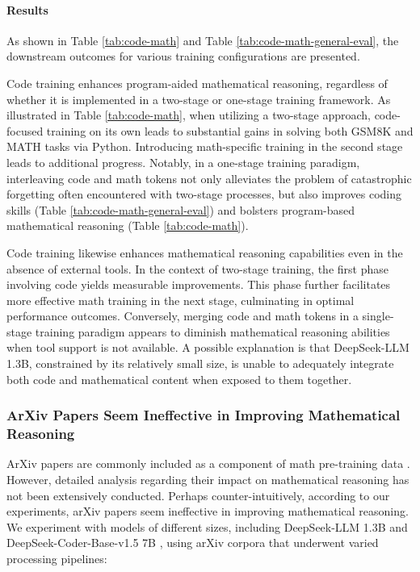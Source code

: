 \begin{itemize}[topsep=0pt]
\begin{itemize}[topsep=0pt]
\paragraph{Results}
As shown in Table \ref{tab:code-math} and Table \ref{tab:code-math-general-eval}, the downstream outcomes for various training configurations are presented.

Code training enhances program-aided mathematical reasoning, regardless of whether it is implemented in a two-stage or one-stage training framework. As illustrated in Table \ref{tab:code-math}, when utilizing a two-stage approach, code-focused training on its own leads to substantial gains in solving both GSM8K and MATH tasks via Python. Introducing math-specific training in the second stage leads to additional progress. Notably, in a one-stage training paradigm, interleaving code and math tokens not only alleviates the problem of catastrophic forgetting often encountered with two-stage processes, but also improves coding skills (Table \ref{tab:code-math-general-eval}) and bolsters program-based mathematical reasoning (Table \ref{tab:code-math}).

Code training likewise enhances mathematical reasoning capabilities even in the absence of external tools. In the context of two-stage training, the first phase involving code yields measurable improvements. This phase further facilitates more effective math training in the next stage, culminating in optimal performance outcomes. Conversely, merging code and math tokens in a single-stage training paradigm appears to diminish mathematical reasoning abilities when tool support is not available. A possible explanation is that DeepSeek-LLM 1.3B, constrained by its relatively small size, is unable to adequately integrate both code and mathematical content when exposed to them together.

\subsubsection{ArXiv Papers Seem Ineffective in Improving Mathematical Reasoning}

ArXiv papers are commonly included as a component of math pre-training data \citep{minerva,gpt-f,llemma,mathpile}. However, detailed analysis regarding their impact on mathematical reasoning has not been extensively conducted. Perhaps counter-intuitively, according to our experiments, arXiv papers seem ineffective in improving mathematical reasoning. We experiment with models of different sizes, including DeepSeek-LLM 1.3B and DeepSeek-Coder-Base-v1.5 7B \citep{deepseek-coder}, using arXiv corpora that underwent varied processing pipelines:


\end{itemize}
\end{itemize}
